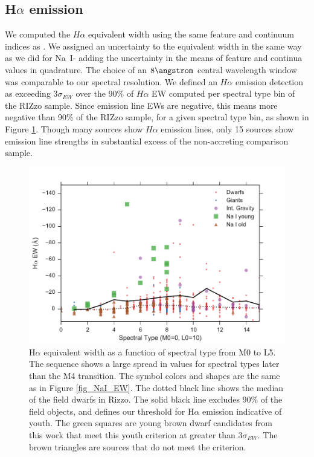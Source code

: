 \subsection{H$\alpha$ emission}
We computed the $H\alpha$ equivalent width using the same feature and continuum indices as \citet{2011AJ....141...97W}.  We assigned an uncertainty to the equivalent width in the same way as we did for Na~I- adding the uncertainty in the means of feature and continua values in quadrature.  The choice of an $8 \angstrom$ central wavelength window was comparable to our spectral resolution.  We defined an $H\alpha$ emission detection as exceeding 3$\sigma_{EW}$ over the 90\% of $H\alpha$ EW computed per spectral type bin of the RIZzo sample.  Since emission line EWs are negative, this means more negative than 90\% of the RIZzo sample, for a given spectral type bin, as shown in Figure \ref{fig_Ha_EW}.  Though many sources show $H\alpha$ emission lines, only 15 sources show emission line strengths in substantial excess of the non-accreting comparison sample.

\begin{figure}[ht!]
  \caption{H$\alpha$ equivalent width as a function of spectral type from M0 to L5.  The sequence shows a large spread in values for spectral types later than the M4 transition.  The symbol colors and shapes are the same as in Figure \ref{fig_NaI_EW}.  The dotted black line shows the median of the field dwarfs in Rizzo.  The solid black line excludes 90\% of the field objects, and defines our threshold for H$\alpha$ emission indicative of youth.  The green squares are young brown dwarf candidates from this work that meet this youth criterion at greater than $3\sigma_{EW}$.  The brown triangles are sources that do not meet the criterion. \label{fig_Ha_EW} }
\centering
\includegraphics[scale=0.6]{chIMACS/figures/Ha_EW}
\end{figure}


